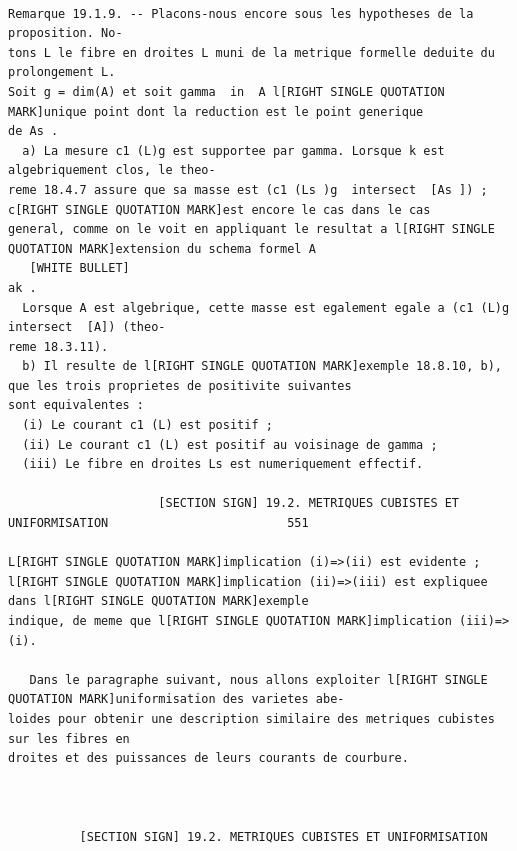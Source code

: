 \documentclass[
  11pt,
]{article}
\begin{document}
\begin{lstlisting}

Remarque 19.1.9. -- Placons-nous encore sous les hypotheses de la proposition. No-
tons L le fibre en droites L muni de la metrique formelle deduite du prolongement L.
Soit g = dim(A) et soit gamma  in  A l[RIGHT SINGLE QUOTATION MARK]unique point dont la reduction est le point generique
de As .
  a) La mesure c1 (L)g est supportee par gamma. Lorsque k est algebriquement clos, le theo-
reme 18.4.7 assure que sa masse est (c1 (Ls )g  intersect  [As ]) ; c[RIGHT SINGLE QUOTATION MARK]est encore le cas dans le cas
general, comme on le voit en appliquant le resultat a l[RIGHT SINGLE QUOTATION MARK]extension du schema formel A
   [WHITE BULLET]
ak .
  Lorsque A est algebrique, cette masse est egalement egale a (c1 (L)g  intersect  [A]) (theo-
reme 18.3.11).
  b) Il resulte de l[RIGHT SINGLE QUOTATION MARK]exemple 18.8.10, b), que les trois proprietes de positivite suivantes
sont equivalentes :
  (i) Le courant c1 (L) est positif ;
  (ii) Le courant c1 (L) est positif au voisinage de gamma ;
  (iii) Le fibre en droites Ls est numeriquement effectif.

                     [SECTION SIGN] 19.2. METRIQUES CUBISTES ET UNIFORMISATION                         551

L[RIGHT SINGLE QUOTATION MARK]implication (i)=>(ii) est evidente ; l[RIGHT SINGLE QUOTATION MARK]implication (ii)=>(iii) est expliquee dans l[RIGHT SINGLE QUOTATION MARK]exemple
indique, de meme que l[RIGHT SINGLE QUOTATION MARK]implication (iii)=>(i).

   Dans le paragraphe suivant, nous allons exploiter l[RIGHT SINGLE QUOTATION MARK]uniformisation des varietes abe-
loides pour obtenir une description similaire des metriques cubistes sur les fibres en
droites et des puissances de leurs courants de courbure.



          [SECTION SIGN] 19.2. METRIQUES CUBISTES ET UNIFORMISATION


\end{lstlisting}
\end{document}
